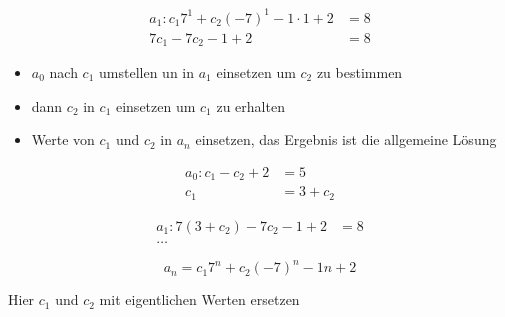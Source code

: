 \begin{align*}
a_1: c_1 7^1 + c_2(-7)^1 - 1\cdot 1 + 2 &= 8\\
7c_1 - 7c_2 -1 + 2 &= 8
\end{align*}

\begin{itemize}
\item $a_0$ nach $c_1$ umstellen un in $a_1$ einsetzen um $c_2$ zu bestimmen
\item dann $c_2$ in $c_1$ einsetzen um $c_1$ zu erhalten
\item Werte von $c_1$ und $c_2$ in $a_n$ einsetzen, das Ergebnis ist die allgemeine Lösung
\end{itemize}

\begin{align*}
a_0: c_1 - c_2 + 2 &= 5\\
c_1 &= 3 + c_2
\end{align*}

\begin{align*}
a_1: 7(3 + c_2) - 7c_2 -1 + 2 &= 8\\
\dots
\end{align*}

$$
\boxed{a_n = c_1 7^n + c_2 (-7)^n -1n + 2}
$$

Hier $c_1$ und $c_2$ mit eigentlichen Werten ersetzen





